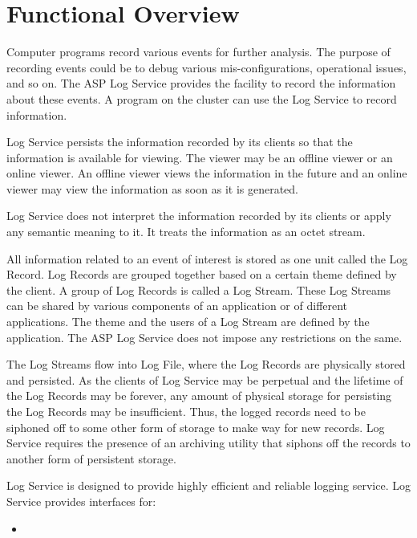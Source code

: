 \hypertarget{group__group26}{
\chapter{Functional Overview}
\label{group__group26}
}


\begin{flushleft}

Computer programs record various events for further analysis. The purpose of recording events could be to debug various mis-configurations, operational
issues, and so on.
The ASP Log Service provides the facility to record the information about these events. 
A program on the cluster can use the Log Service to record information. 
\par
Log Service persists the information recorded by its clients so that the information is available for viewing.
The viewer may be an offline viewer or an online viewer. An offline viewer views the information in the future and an online viewer may view the 
information as soon as it is generated. 
\par
Log Service does not interpret the information recorded by its clients or apply any 
semantic meaning to it. It treats the information as an octet stream.
\par
All information related to an event of interest is stored as one unit called the Log Record. Log Records are grouped together based on a certain 
theme defined by the client. A group of Log Records is called a Log Stream. These Log Streams can be shared by various components of an application or 
of different applications. The theme and the users of a Log Stream are defined by the application. The ASP Log Service does not impose any 
restrictions on the same. 
\par
The Log Streams flow into Log File, where the Log Records are physically stored and persisted. As the clients of Log Service may be perpetual and 
the lifetime of the Log Records may be forever, any amount of physical storage for persisting the Log Records may be insufficient. 
Thus, the logged records need to be siphoned off to some other form of storage to make way for new records. Log Service requires the presence of an 
archiving utility that siphons off the records to another form of persistent storage. 
\par
Log Service is designed to provide highly efficient and reliable logging service. Log Service provides interfaces for:
\begin{itemize}
\item

\end{itemize}
\end{flushleft}
